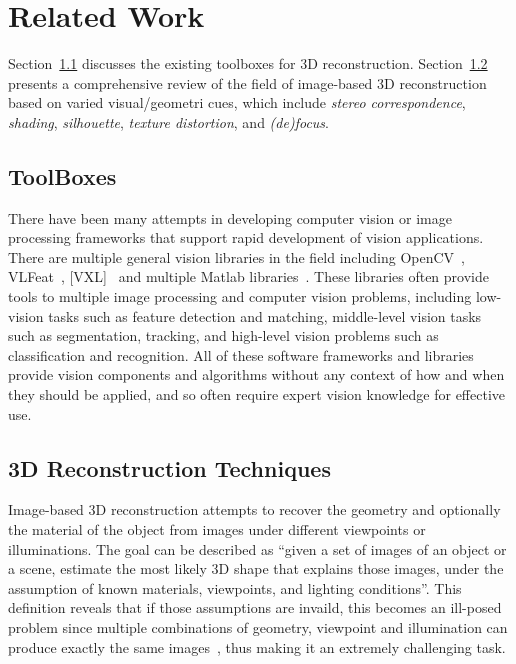 
\chapter{Related Work}
\label{ch:RelatedWork}
Section~\ref{sec:Toolbox} discusses the existing toolboxes for 3D reconstruction. Section~\ref{sec:3DRecon_Tech} presents a comprehensive review of the field of image-based 3D reconstruction based on varied visual/geometri cues, which include \textit{stereo correspondence}, \textit{shading}, \textit{silhouette}, \textit{texture distortion}, and \textit{(de)focus}.

\section{ToolBoxes}
\label{sec:Toolbox}
There have been many attempts in developing computer vision or image processing frameworks that support rapid development of vision applications. There are multiple general vision libraries in the field including OpenCV~\cite{bradski2008learning}, VLFeat~\cite{vedaldi08vlfeat}, [VXL]~\cite{vxl17} and multiple Matlab libraries~\cite{KovesiMATLABCode, MariottiniPr_RAM05}. These libraries often provide tools to multiple image processing and computer vision problems, including low-vision tasks such as feature detection and matching, middle-level vision tasks such as segmentation, tracking, and high-level vision problems such as classification and recognition. All of these software frameworks and libraries provide vision components and algorithms without any context of how and when they should be applied, and so often require expert vision knowledge for effective use.

\section{3D Reconstruction Techniques}
\label{sec:3DRecon_Tech}
Image-based 3D reconstruction attempts to recover the geometry and optionally the material of the object from images under different viewpoints or illuminations. The goal can be described as ``given a set of images of an object or a scene, estimate the most likely 3D shape that explains those images, under the assumption of known materials, viewpoints, and lighting conditions''. This definition reveals that if those assumptions are invaild, this becomes an ill-posed problem since multiple combinations of geometry, viewpoint and illumination can produce exactly the same images~\cite{poggio1985computational}, thus making it an extremely challenging task.

